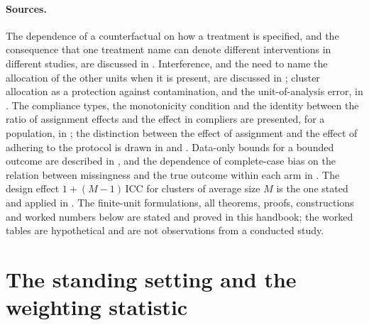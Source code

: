 \paragraph{Sources.}
The dependence of a counterfactual on how a treatment is specified, and
the consequence that one treatment name can denote different interventions
in different studies, are discussed in
\cite[\S3.4, pp.~34--36]{HernanRobins2020WhatIf2026}. Interference, and the
need to name the allocation of the other units when it is present, are
discussed in \cite[Fine Point~1.1, p.~5]{HernanRobins2020WhatIf2026}; cluster
allocation as a protection against contamination, and the unit-of-analysis
error, in \cite[\S\S23.1.1, 23.1.3]{HigginsEldridgeLi2024Cochrane23}. The
compliance types, the monotonicity condition and the identity between the
ratio of assignment effects and the effect in compliers are presented, for
a population, in \cite[\S16.4, pp.~217--218, and Technical Point~16.7,
p.~224]{HernanRobins2020WhatIf2026}; the distinction between the effect of
assignment and the effect of adhering to the protocol is drawn in
\cite[\S22.1, p.~306]{HernanRobins2020WhatIf2026} and
\cite[\S\S8.2.2, 8.4.4]{HigginsSavovicEtAl2024Cochrane08}. Data-only bounds
for a bounded outcome are described in
\cite[Technical Point~16.2, p.~212]{HernanRobins2020WhatIf2026}, and the
dependence of complete-case bias on the relation between missingness and the
true outcome within each arm in
\cite[\S\S8.5.1--8.5.2]{HigginsSavovicEtAl2024Cochrane08}. The design effect
\(1+(M-1)\,\mathrm{ICC}\) for clusters of average size \(M\) is the one
stated and applied in \cite[\S\S23.1.4--23.1.4.1]{HigginsEldridgeLi2024Cochrane23}.
The finite-unit formulations, all theorems, proofs, constructions and worked
numbers below are stated and proved in this handbook; the worked tables are
hypothetical and are not observations from a conducted study.

\section{The standing setting and the weighting statistic}
\label{sec:p15-w02b-p15-076-setting}

